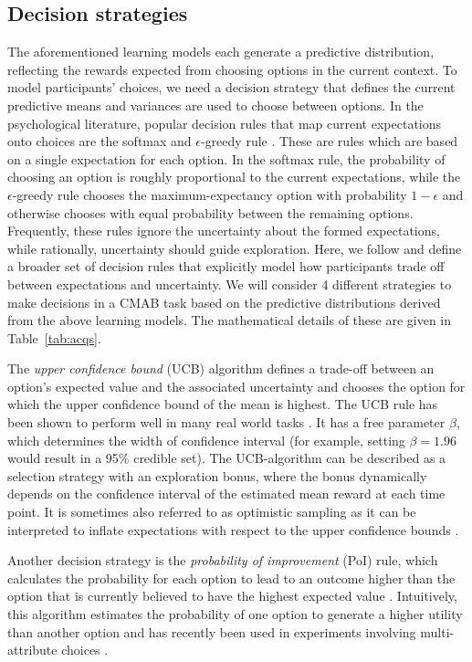 \documentclass[a4paper,natbib]{apa6}
\begin{document}
\subsection{Decision strategies}
The aforementioned learning models each generate a predictive distribution, reflecting the rewards expected from choosing options in the current context. To model participants' choices, we need a decision strategy that defines the current predictive means and variances are used to choose between options. In the psychological literature, popular decision rules that map current expectations onto choices are the softmax and $\epsilon$-greedy rule \citep{sutton1998reinforcement}. These are rules which are based on a single expectation for each option. In the softmax rule, the probability of choosing an option is roughly proportional to the current expectations, while the $\epsilon$-greedy rule chooses the maximum-expectancy option with probability $1-\epsilon$ and otherwise chooses with equal probability between the remaining options. Frequently, these rules ignore the uncertainty about the formed expectations, while rationally, uncertainty should guide exploration. Here, we follow \cite{speekenbrinkuncertainty} and define a broader set of decision rules that explicitly model how participants trade off between expectations and uncertainty. We will consider 4 different strategies to make decisions in a CMAB task based on the predictive distributions derived from the above learning models. The mathematical details of these are given in Table~\ref{tab:acqs}. 

The \emph{upper confidence bound} (UCB) algorithm defines a trade-off between an option's expected value and the associated uncertainty and chooses the option for which the upper confidence bound of the mean is highest. The UCB rule has been shown to perform well in many real world tasks \citep{krause2011contextual}.
It has a free parameter $\beta$, which determines the width of confidence interval (for example, setting $\beta=1.96$ would result in a 95\% credible set). The UCB-algorithm can be described as a selection strategy with an exploration bonus, where the bonus dynamically depends on the confidence interval of the estimated mean reward at each time point. It is sometimes also referred to as optimistic sampling as it can be interpreted to inflate expectations with respect to the upper confidence bounds \citep{srinivas2009gaussian}.

Another decision strategy is the \emph{probability of improvement} (PoI) rule, which calculates the probability for each option to lead to an outcome higher than the option that is currently believed to have the highest expected value \citep{kushner1964new}. Intuitively, this algorithm estimates the probability of one option to generate a higher utility than another option and has recently been used in experiments involving multi-attribute choices \citep{gershman2016structured}. 
\end{document}
